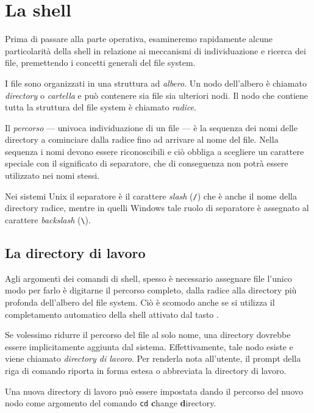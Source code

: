 
\chapter{La shell}
\label{chapShell}

Prima di passare alla parte operativa, esamineremo rapidamente alcune
particolarità della shell in relazione ai meccanismi di individuazione e ricerca
dei file, premettendo i concetti generali del file system.

I file sono organizzati in una struttura ad \emph{albero}. Un nodo dell'albero è
chiamato \emph{directory} o \emph{cartella} e può contenere sia file sia
ulteriori nodi. Il nodo che contiene tutta la struttura del file system è
chiamato \emph{radice}.

Il \emph{percorso} --- univoca individuazione di un file --- è la sequenza dei
nomi delle directory a cominciare dalla radice fino ad arrivare al nome del
file. Nella sequenza i nomi devono essere riconoscibili e ciò obbliga a
scegliere un carattere speciale con il significato di separatore, che di
conseguenza non potrà essere utilizzato nei nomi stessi.

Nei sistemi Unix il separatore è il carattere \emph{slash} (\texttt{/}) che è
anche il nome della directory radice, mentre in quelli Windows tale ruolo di
separatore è assegnato al carattere \emph{backslash} (\verb=\=).

\section{La directory di lavoro}

Agli argomenti dei comandi di shell, spesso è necessario assegnare file
l'unico modo per farlo è digitarne il percorso completo, dalla radice alla
directory più profonda dell'albero del file system. Ciò è scomodo anche se si
utilizza il completamento automatico della shell attivato dal tasto .

Se volessimo ridurre il percorso del file al solo nome, una directory dovrebbe
essere implicitamente aggiunta dal sistema. Effettivamente, tale nodo esiste e
viene chiamato \emph{directory di lavoro}. Per renderla nota all'utente, il
prompt della riga di comando riporta in forma estesa o abbreviata la directory
di lavoro.

Una nuova directory di lavoro può essere impostata dando il percorso del nuovo
nodo come argomento del comando \texttt{cd} \textbf{c}hange \textbf{d}irectory.

